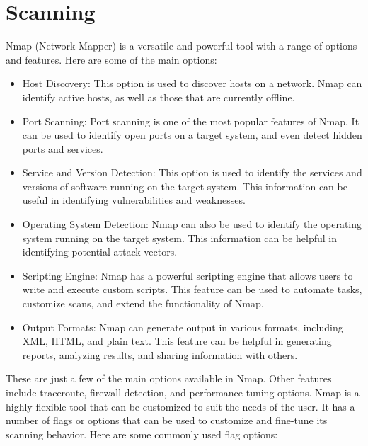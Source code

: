 \documentclass[a4paper, 12pt, oneside]{extbook}
\begin{document}
\chapter{Scanning}
Nmap (Network Mapper) is a versatile and powerful tool with a range of options and features. Here are some of the main options:
\begin{itemize}
  \item Host Discovery: This option is used to discover hosts on a network. Nmap can identify active hosts, as well as those that are currently offline.
  \item Port Scanning: Port scanning is one of the most popular features of Nmap. It can be used to identify open ports on a target system, and even detect hidden ports and services.
  \item Service and Version Detection: This option is used to identify the services and versions of software running on the target system. This information can be useful in identifying vulnerabilities and weaknesses.
  \item Operating System Detection: Nmap can also be used to identify the operating system running on the target system. This information can be helpful in identifying potential attack vectors.
  \item Scripting Engine: Nmap has a powerful scripting engine that allows users to write and execute custom scripts. This feature can be used to automate tasks, customize scans, and extend the functionality of Nmap.
  \item Output Formats: Nmap can generate output in various formats, including XML, HTML, and plain text. This feature can be helpful in generating reports, analyzing results, and sharing information with others.
\end{itemize} 
These are just a few of the main options available in Nmap. Other features include traceroute, firewall detection, and performance tuning options. Nmap is a highly flexible tool that can be customized to suit the needs of the user.
It has a number of flags or options that can be used to customize and fine-tune its scanning behavior.
\newline Here are some commonly used flag options:
\end{document}

